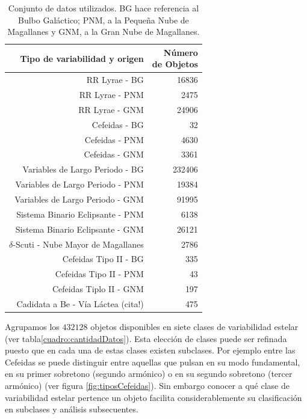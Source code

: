 \documentclass[letterpaper,12pt]{book}
\begin{document}
\begin{table}
  \centering
  \caption{Conjunto de datos utilizados. BG hace referencia al Bulbo Galáctico; PNM, a la Pequeña Nube de Magallanes y GNM, a la Gran Nube de Magallanes. }
  \label{cuadro:datosUsados}  
  \begin{tabular}{rr}
    \hline
    \hline
    Tipo de variabilidad y origen & \shortstack{Número \\de Objetos}\\
    \hline
    \hline 
    RR Lyrae - BG\cite{soszynski_optical_2011-2} & 16836\\
    RR Lyrae - PNM \cite{soszynski_optical_2010}& 2475\\
    RR Lyrae - GNM \cite{soszynski_optical_2009-1}& 24906\\
    \hline
    Cefeidas - BG \cite{soszynski_optical_2011}& 32\\%
    Cefeidas - PNM \cite{soszynski_optical_2010-2}& 4630\\
    Cefeidas - GNM \cite{soszynski_optical_2008-1}& 3361\\
    \hline
    Variables de Largo Periodo - BG \cite{soszynski_optical_2013-1}& 232406\\
    Variables de Largo Periodo - PNM \cite{soszynski_optical_2011-1}& 19384\\
    Variables de Largo Periodo - GNM \cite{soszynski_optical_2009}& 91995\\
    \hline
    Sistema Binario Eclipsante - PNM \cite{pawlak_eclipsing_2013}& 6138\\
    Sistema Binario Eclipsante - GNM \cite{graczyk_optical_2011}& 26121\\
    \hline
    $\delta$-Scuti - Nube Mayor de Magallanes\cite{poleski_optical_2010} & 2786\\
    \hline
    Cefeidas Tipo II - BG \cite{soszynski_optical_2013}& 335\\
    Cefeidas Tipo II - PNM \cite{soszynski_optical_2010-1}& 43\\
    Cefeidas Tiplo II - GNM \cite{soszynski_optical_2008}& 197\\
    \hline
    Cadidata a Be -  Vía Láctea (cita!) & 475\\
    \hline
    \hline 
  \end{tabular} 
\end{table}


Agrupamos los $432128$ objetos disponibles en siete clases de variabilidad estelar (ver tabla\ref{cuadro:cantidadDatos}). Esta elección de clases puede ser refinada puesto que en cada una de estas clases existen subclases. Por ejemplo entre las Cefeidas se puede distinguir entre aquellas que pulsan en su modo fundamental, en su primer sobretono (segundo armónico) o en su segundo sobretono (tercer armónico)  (ver figura \ref{fig:tiposCefeidas}). Sin embargo conocer a qué clase de variabilidad estelar pertence un objeto facilita considerablemente su clasificación en subclases y análisis subsecuentes. 
\end{document}
